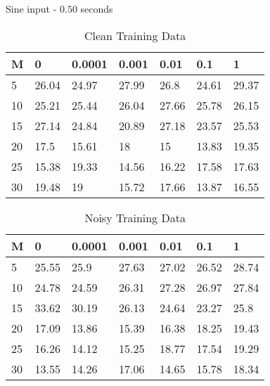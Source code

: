 \documentclass{beamer}
\begin{document}
\begin{frame}{Sine input - $0.50$ seconds}
    \scriptsize
    \begin{table}[!ht]
        \centering
        \begin{tabular}{|l|l|l|l|l|l|l|}
        \hline
            M & 0 & 0.0001 & 0.001 & 0.01 & 0.1 & 1 \\ \hline
            5 & 26.04 & 24.97 & 27.99 & 26.8 & 24.61 & 29.37 \\ \hline
            10 & 25.21 & 25.44 & 26.04 & 27.66 & 25.78 & 26.15 \\ \hline
            15 & 27.14 & 24.84 & 20.89 & 27.18 & 23.57 & 25.53 \\ \hline
            20 & 17.5 & 15.61 & 18 & 15 & 13.83 & 19.35 \\ \hline
            25 & 15.38 & 19.33 & 14.56 & 16.22 & 17.58 & 17.63 \\ \hline
            30 & 19.48 & 19 & 15.72 & 17.66 & 13.87 & 16.55 \\ \hline
        \end{tabular}
        \caption{Clean Training Data}
    \end{table}

    \begin{table}[!ht]
        \centering
        \begin{tabular}{|l|l|l|l|l|l|l|}
        \hline
            M & 0 & 0.0001 & 0.001 & 0.01 & 0.1 & 1 \\ \hline
            5 & 25.55 & 25.9 & 27.63 & 27.02 & 26.52 & 28.74 \\ \hline
            10 & 24.78 & 24.59 & 26.31 & 27.28 & 26.97 & 27.84 \\ \hline
            15 & 33.62 & 30.19 & 26.13 & 24.64 & 23.27 & 25.8 \\ \hline
            20 & 17.09 & 13.86 & 15.39 & 16.38 & 18.25 & 19.43 \\ \hline
            25 & 16.26 & 14.12 & 15.25 & 18.77 & 17.54 & 19.29 \\ \hline
            30 & 13.55 & 14.26 & 17.06 & 14.65 & 15.78 & 18.34 \\ \hline
        \end{tabular}
        \caption{Noisy Training Data}
    \end{table}
\end{frame}
\end{document}
